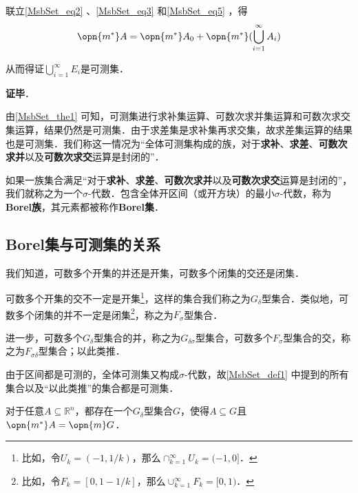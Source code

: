联立\autoref{MsbSet_eq2} 、\autoref{MsbSet_eq3} 和\autoref{MsbSet_eq5} ，得
\begin{equation}
\opn{m^*}A=\opn{m^*}A_0+\opn{m^*}(\bigcup_{i=1}^\infty A_i)
\end{equation}

从而得证$\bigcup_{i=1}^\infty E_i$是可测集．




\textbf{证毕}．


由\autoref{MsbSet_the1} 可知，可测集进行求补集运算、可数次求并集运算和可数次求交集运算，结果仍然是可测集．由于求差集是求补集再求交集，故求差集运算的结果也是可测集．我们称这一情况为“全体可测集构成的族，对于\textbf{求补}、\textbf{求差}、\textbf{可数次求并}以及\textbf{可数次求交}运算是封闭的”．

\begin{definition}{}
如果一族集合满足“对于\textbf{求补}、\textbf{求差}、\textbf{可数次求并}以及\textbf{可数次求交}运算是封闭的”，我们就称之为一个$\sigma$-代数．包含全体开区间（或开方块）的最小$\sigma$-代数，称为\textbf{Borel族}，其元素都被称作\textbf{Borel集}．
\end{definition}


\subsection{Borel集与可测集的关系}

\begin{definition}{}

我们知道，可数多个开集的并还是开集，可数多个闭集的交还是闭集．

可数多个开集的交不一定是开集\footnote{比如，令$U_k=(-1, 1/k)$，那么$\cap_{k=1}^\infty U_k=(-1, 0]$．}，这样的集合我们称之为$G_\delta$型集合\cite{十一五实变函数论}．类似地，可数多个闭集的并不一定是闭集\footnote{比如，令$F_k=[0, 1-1/k]$，那么$\cup_{k=1}^\infty F_k=[0, 1)$．}，称之为$F_\sigma$型集合．

进一步，可数多个$G_\delta$型集合的并，称之为$G_{\delta\sigma}$型集合，可数多个$F_\sigma$型集合的交，称之为$F_{\sigma\delta}$型集合；以此类推．

\end{definition}

由于区间都是可测的，全体可测集又构成$\sigma$-代数，故\autoref{MsbSet_def1} 中提到的所有集合以及“以此类推”的集合都是可测集．




\begin{theorem}{}\label{MsbSet_the2}
对于任意$A\subseteq \mathbb{R}^n$，都存在一个$G_\delta$型集合$G$，使得$A\subseteq G$且$\opn{m^*}A=\opn{m}G$．
\end{theorem}

